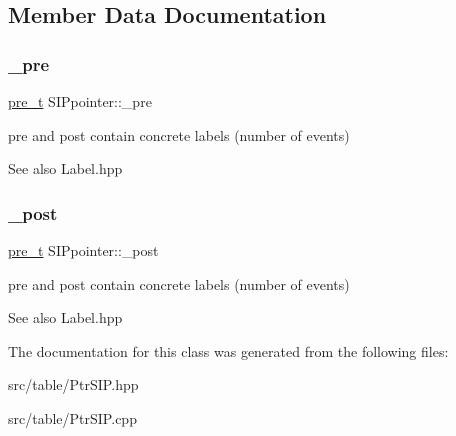 \subsection{Member Data Documentation}
\mbox{\label{classSIPpointer_acfbd9084ef6db9de5776896247ac71c8}} 
\subsubsection{\texorpdfstring{\_pre}{\_pre}}
{\footnotesize\ttfamily \mbox{\hyperlink{group__general_ga092fe8b972dfa977c2a0886720a7731e}{pre\+\_\+t}} S\+I\+Ppointer\+::\+\_\+pre\hspace{0.3cm}{\ttfamily [protected]}}



pre and post contain concrete labels (number of events) 

\begin{DoxySeeAlso}{See also}
Label.\+hpp 
\end{DoxySeeAlso}
\mbox{\label{classSIPpointer_ab8ae3255dd4e6f898db0c5e49c860f28}} 
\subsubsection{\texorpdfstring{\_post}{\_post}}
{\footnotesize\ttfamily \mbox{\hyperlink{group__general_ga092fe8b972dfa977c2a0886720a7731e}{pre\+\_\+t}} S\+I\+Ppointer\+::\+\_\+post\hspace{0.3cm}{\ttfamily [protected]}}



pre and post contain concrete labels (number of events) 

\begin{DoxySeeAlso}{See also}
Label.\+hpp 
\end{DoxySeeAlso}


The documentation for this class was generated from the following files\+:\begin{DoxyCompactItemize}
\item 
src/table/Ptr\+S\+I\+P.\+hpp\item 
src/table/Ptr\+S\+I\+P.\+cpp\end{DoxyCompactItemize}
